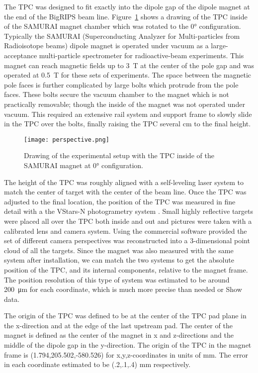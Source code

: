 The \spirit TPC was designed to fit exactly into the dipole gap of the  dipole magnet at the end of the BigRIPS beam line. Figure~\ref{fig:experiment} shows a drawing of the \spirit TPC inside of the SAMURAI magnet chamber which was rotated to the $\ang{0}$ configuration. Typically the SAMURAI (Superconducting Analyzer for Multi-particles from Radioisotope beams) dipole magnet is operated under vacuum as a large-acceptance multi-particle spectrometer for radioactive-beam experiments. This magnet can reach magnetic fields up to \SI{3}{\tesla} at the center of the pole gap and was operated at \SI{0.5}{\tesla} for these sets of experiments. The space between the magnetic pole faces is further complicated by large bolts which protrude from the pole faces. These bolts secure the vacuum chamber to the magnet which is not practically removable; though the inside of the magnet was not operated under vacuum. This required an extensive rail system and support frame to slowly slide in the TPC over the bolts, finally raising the TPC several \si{\centi\metre} to the final height. 

\begin{figure}
\texttt{[image: perspective.png]}
\caption{Drawing of the experimental setup with the TPC inside of the SAMURAI magnet at $\ang{0}$ configuration.}
\label{fig:experiment}
\end{figure}

The height of the TPC was roughly aligned with a self-leveling laser system to match the center of target with the center of the beam line. Once the TPC was adjusted to the final location, the position of the TPC was measured in fine detail with a the VStars-N photogrametry system \cite{vstars}. Small highly reflective targets were placed all over the TPC both inside and out and pictures were taken with a calibrated lens and camera system. Using the commercial software provided the set of different camera perspectives was reconstructed into a 3-dimensional point cloud of all the targets. Since the magnet was also measured with the same system after installation, we can match the two systems to get the absolute position of the TPC, and its internal components, relative to the magnet frame. The position resolution of this type of system was estimated to be around \SI{200}{\micro\metre} for each coordinate, which is much more precise than needed or Show data.

The origin of the \spirit TPC was defined to be at the center of the TPC pad plane in the x-direction and at the edge of the last upstream pad. The center of the magnet is defined as the center of the magnet in x and z-directions and the middle of the dipole gap in the y-direction. The origin of the \spirit TPC in the magnet frame is (1.794,205.502,-580.526) for x,y,z-coordinates in units of \si{\milli\metre}. The error in each coordinate estimated to be (.2,.1,.4) \si{\milli\metre} respectively. 

